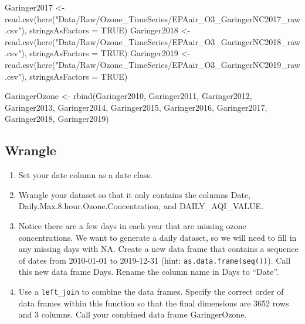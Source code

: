 \documentclass[
]{article}
\newenvironment{Shaded}{\begin{snugshade}}{\end{snugshade}}
\newcommand{\AttributeTok}[1]{\textcolor[rgb]{0.77,0.63,0.00}{#1}}
\newcommand{\ConstantTok}[1]{\textcolor[rgb]{0.00,0.00,0.00}{#1}}
\newcommand{\FunctionTok}[1]{\textcolor[rgb]{0.00,0.00,0.00}{#1}}
\newcommand{\NormalTok}[1]{#1}
\newcommand{\OtherTok}[1]{\textcolor[rgb]{0.56,0.35,0.01}{#1}}
\newcommand{\StringTok}[1]{\textcolor[rgb]{0.31,0.60,0.02}{#1}}
\begin{document}
\begin{Shaded}
\begin{Highlighting}[]
\NormalTok{Garinger2017 }\OtherTok{\textless{}{-}} \FunctionTok{read.csv}\NormalTok{(}\FunctionTok{here}\NormalTok{(}\StringTok{"Data/Raw/Ozone\_TimeSeries/EPAair\_O3\_GaringerNC2017\_raw.csv"}\NormalTok{), }\AttributeTok{stringsAsFactors =} \ConstantTok{TRUE}\NormalTok{)}
\NormalTok{Garinger2018 }\OtherTok{\textless{}{-}} \FunctionTok{read.csv}\NormalTok{(}\FunctionTok{here}\NormalTok{(}\StringTok{"Data/Raw/Ozone\_TimeSeries/EPAair\_O3\_GaringerNC2018\_raw.csv"}\NormalTok{), }\AttributeTok{stringsAsFactors =} \ConstantTok{TRUE}\NormalTok{)}
\NormalTok{Garinger2019 }\OtherTok{\textless{}{-}} \FunctionTok{read.csv}\NormalTok{(}\FunctionTok{here}\NormalTok{(}\StringTok{"Data/Raw/Ozone\_TimeSeries/EPAair\_O3\_GaringerNC2019\_raw.csv"}\NormalTok{), }\AttributeTok{stringsAsFactors =} \ConstantTok{TRUE}\NormalTok{)}

\NormalTok{GaringerOzone }\OtherTok{\textless{}{-}} \FunctionTok{rbind}\NormalTok{(Garinger2010, Garinger2011, Garinger2012, Garinger2013, Garinger2014, Garinger2015, Garinger2016, Garinger2017, Garinger2018, Garinger2019)}
\end{Highlighting}
\end{Shaded}

\hypertarget{wrangle}{%
\subsection{Wrangle}\label{wrangle}}

\begin{enumerate}
\def\labelenumi{\arabic{enumi}.}
\setcounter{enumi}{2}
\item
  Set your date column as a date class.
\item
  Wrangle your dataset so that it only contains the columns Date,
  Daily.Max.8.hour.Ozone.Concentration, and DAILY\_AQI\_VALUE.
\item
  Notice there are a few days in each year that are missing ozone
  concentrations. We want to generate a daily dataset, so we will need
  to fill in any missing days with NA. Create a new data frame that
  contains a sequence of dates from 2010-01-01 to 2019-12-31 (hint:
  \texttt{as.data.frame(seq())}). Call this new data frame Days. Rename
  the column name in Days to ``Date''.
\item
  Use a \texttt{left\_join} to combine the data frames. Specify the
  correct order of data frames within this function so that the final
  dimensions are 3652 rows and 3 columns. Call your combined data frame
  GaringerOzone.
\end{enumerate}
\end{document}
